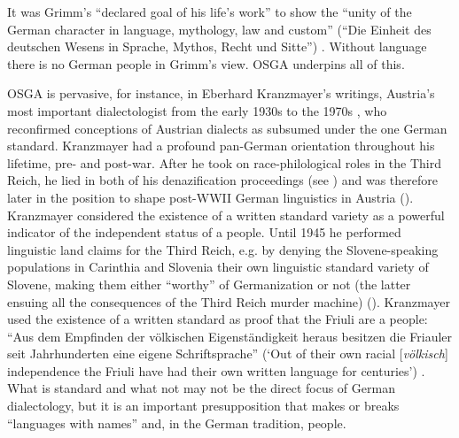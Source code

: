 \documentclass[output=paper]{langscibook}
\begin{document}
It was Grimm’s “declared goal of his life’s work” to show the “unity of the German character in language, mythology, law and custom” (“Die Einheit des deutschen Wesens in Sprache, Mythos, Recht und Sitte”) \citep[22]{Lämmert1967}. Without language there is no German people in Grimm’s view. OSGA underpins all of this.

OSGA is pervasive, for instance, in Eberhard Kranzmayer’s writings, Austria’s most important dialectologist from the early 1930s to the 1970s \citep[397]{Pohl2006}, who reconfirmed conceptions of Austrian dialects as subsumed under the one German standard. Kranzmayer had a profound pan-German orientation throughout his lifetime, pre- and post-war. After he took on race-philological roles in the Third Reich, he lied in both of his denazification proceedings (see \citealt{Dollinger2023a}) and was therefore later in the position to shape post-WWII German linguistics in Austria (\citealt{Kronsteiner2016,Jandl2022}). Kranzmayer considered the existence of a written standard variety as a powerful indicator of the independent status of a people. Until 1945 he performed linguistic land claims for the Third Reich, e.g. by denying the Slovene-speaking populations in Carinthia and Slovenia their own linguistic standard variety of Slovene, making them either “worthy” of Germanization or not (the latter ensuing all the consequences of the Third Reich murder machine) (\citealt{Dollinger2023b,Dollinger2024}). Kranzmayer used the existence of a written standard as proof that the Friuli are a people: ``Aus dem Empfinden der völkischen Eigenständigkeit heraus besitzen die Friauler seit Jahrhunderten eine eigene Schriftsprache'' (`Out of their own racial [\textit{völkisch}] independence the Friuli have had their own written language for centuries') \citep[2]{Kranzmayer1943}. What is standard and what not may not be the direct focus of German dialectology, but it is an important presupposition that makes or breaks “languages with names” and, in the German tradition, people.
\end{document}
